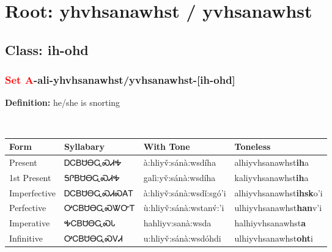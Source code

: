 \needspace{4in}
\section*{Root: yhvhsanawhst / yvhsanawhst}
\nopagebreak
{}
\needspace{3in}
\subsection*{Class: ih-ohd}
\nopagebreak
\needspace{2in}
\subsubsection*{\textcolor{Red}{Set A}{-}ali{-}\textbf{yhvhsanawhst/yvhsanawhst}{-}[ih-ohd]}
\nopagebreak
\textbf{Definition: } he/she is snorting
\\[0.5em]
\begin{tabularx}{\textwidth}{l X X X}%
\toprule%
\textbf{Form}&\textbf{Syllabary}&\textbf{With Tone}&\textbf{Toneless}\\%
\midrule%
Present&ᎠᏟᏴᏌᎾᏩᏍᏗᎭ&à:hliyv̌:sánà:wsdíha&alhiyvhsanawhst\textbf{ih}a\\%
1st Present&ᎦᎵᏴᏌᎾᏩᏍᏗᎭ&galì:yv̌:sánà:wsdíha&kaliyvhsanawhst\textbf{ih}a\\%
Imperfective&ᎠᏟᏴᏌᎾᏩᏍᏗᏍᎪᎢ&à:hliyv̌:sánà:wsdǐ:sgó’i&alhiyvhsanawhst\textbf{ihsk}o'i\\%
Perfective&ᎤᏟᏴᏌᎾᏩᏍᏔᏅᎢ&ù:hliyv̌:sánà:wstanv́:’i&ulhiyvhsanawhst\textbf{han}v'i\\%
Imperative&ᎭᏟᏴᏌᎾᏩᏍᏓ&hahliyv:sanà:wsda&halhiyvhsanawhst\textbf{a}\\%
Infinitive&ᎤᏟᏴᏌᎾᏩᏍᏙᏗ&u:hliyv̌:sánà:wsdóhdi&ulhiyvhsanawhst\textbf{oht}i\\%
\bottomrule%
\end{tabularx}
\\[1em]